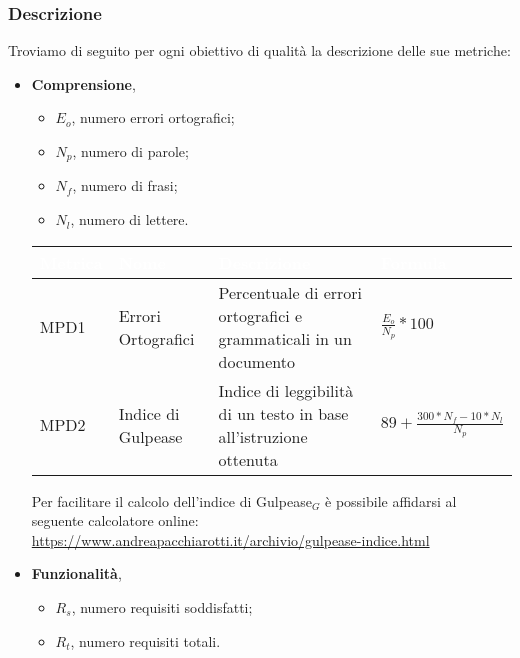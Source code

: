    \subsubsection{Descrizione}
   Troviamo di seguito per ogni obiettivo di qualità la descrizione delle sue metriche:
    \begin{itemize}
        \item \textbf{Comprensione},
            \begin{itemize}
                \item $E_o$, numero errori ortografici;
                \item $N_p$, numero di parole;
                \item $N_f$, numero di frasi;
                \item $N_l$, numero di lettere.
            \end{itemize}
            \renewcommand\arraystretch{1,5}
            \begin{center}
                \begin{tabular}{|p{1.7cm}|p{3cm}|p{4.5cm}|p{3cm}|} \hline
                  \rowcolor[HTML]{036400}
                  \textcolor[HTML]{FFFFFF}{\textbf{Metrica}} & \textcolor[HTML]{FFFFFF}{\textbf{Nome}} & \textcolor[HTML]{FFFFFF}{\textbf{Descrizione}} & \textcolor[HTML]{FFFFFF}{\textbf{Formula}}    \\ \hline
                    \rowcolor[HTML]{EFEFEF}
                    MPD1 & Errori Ortografici    & Percentuale di errori ortografici e grammaticali in un documento      & $\frac{E_o}{N_p}*100$        \\ \hline
                    \rowcolor[HTML]{C0C0C0}
                    MPD2 & Indice di Gulpease    & Indice di leggibilità di un testo in base all'istruzione ottenuta   & $89+\frac{300*N_f-10*N_l}{N_p}$     \\ \hline
                \end{tabular}
            \end{center}
            \renewcommand\arraystretch{1}
            Per facilitare il calcolo dell'indice di Gulpease$_G$ è possibile affidarsi al seguente calcolatore online:\\
            \url{https://www.andreapacchiarotti.it/archivio/gulpease-indice.html}
        \item \textbf{Funzionalità},
            \begin{itemize}
                \item $R_s$, numero requisiti soddisfatti;
                \item $R_t$, numero requisiti totali.

\end{itemize}
\end{itemize}
